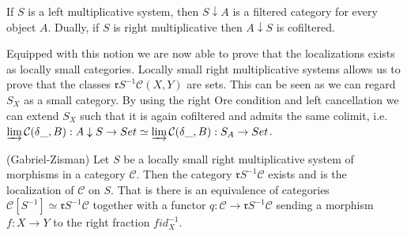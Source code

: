     \begin{remark}
        If $S$ is a left multiplicative system, then $S\downarrow A$ is a filtered category for every object $A$. Dually, if $S$ is right multiplicative then $A\downarrow S$ is cofiltered.
    \end{remark}

    \begin{remark}
        Equipped with this notion we are now able to prove that the localizations exists as locally small categories. Locally small right multiplicative systems allows us to prove that the classes $\mathfrak{r}S^{-1}\mathcal{C}(X,Y)$ are sets. This can be seen as we can regard $S_X$ as a small category. By using the right Ore condition and left cancellation we can extend $S_X$ such that it is again cofiltered and admits the same colimit, i.e.\\
         $\varinjlim\mathcal{C}(\delta\_,B):A\downarrow S\rightarrow Set\simeq\varinjlim\mathcal{C}(\delta\_,B):S_A\rightarrow Set$. 
    \end{remark}

    \begin{theorem}
        (Gabriel-Zisman) Let $S$ be a locally small right multiplicative system of morphisms in a category $\mathcal{C}$. Then the category $\mathfrak{r}S^{-1}\mathcal{C}$ exists and is the localization of $\mathcal{C}$ on $S$. That is there is an equivalence of categories $\mathcal{C}[S^{-1}]\simeq\mathfrak{r}S^{-1}\mathcal{C}$ together with a functor $q: \mathcal{C}\rightarrow\mathfrak{r}S^{-1}\mathcal{C}$ sending a morphism $f : X\rightarrow Y$ to the right fraction $fid_X^{-1}$.
    \end{theorem}

